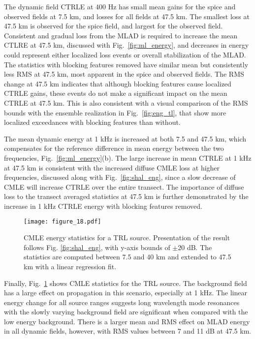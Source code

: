\documentclass[preprint,NumberedRefs]{JASA}
\begin{document}
The dynamic field CTRLE at 400 Hz has small mean gains for the spice and observed fields at 7.5 km, and losses for all fields at 47.5 km. The smallest loss at 47.5 km is observed for the spice field, and largest for the observed field. Consistent and gradual loss from the MLAD is required to increase the mean CTLRE at 47.5 km, discussed with Fig.~\ref{fig:ml_energy}, and decreases in energy could represent either localized loss events or overall stabilization of the MLAD. The statistics with blocking features removed have similar mean but consistently less RMS at 47.5 km, most apparent in the spice and observed fields. The RMS change at 47.5 km indicates that although blocking features cause localized CTRLE gains, these events do not make a significant impact on the mean CTRLE at 47.5 km. This is also consistent with a visual comparison of the RMS bounds with the ensemble realization in Fig.~\ref{fig:eng_tl}, that show more localized exceedances with blocking features than without.

The mean dynamic energy at 1 kHz is increased at both 7.5 and 47.5 km, which compensates for the reference difference in mean energy between the two frequencies, Fig.~\ref{fig:ml_energy}(b). The large increase in mean CTRLE at 1 kHz at 47.5 km is consistent with the increased diffuse CMLE loss at higher frequencies, discussed along with Fig.~\ref{fig:shal_eng}, since a slow decrease of CMLE will increase CTRLE over the entire transect. The importance of diffuse loss to the transect averaged statistics at 47.5 km is further demonstrated by the increase in 1 kHz CTRLE energy with blocking features removed.

\begin{figure}
\texttt{[image: figure\_18.pdf]}
    \caption{CMLE energy statistics for a TRL source. Presentation of the result follows Fig. \ref{fig:shal_eng}, with y-axis bounds of $\pm$20 dB. The statistics are computed between 7.5 and 40 km and extended to 47.5 km with a linear regression fit.}
    \label{fig:deep_eng}
\end{figure}
Finally, Fig.~\ref{fig:deep_eng} shows CMLE statistics for the TRL source. The background field has a large effect on propagation in this scenario, especially at 1 kHz. The linear energy change for all source ranges suggests long wavelength mode resonances with the slowly varying background field\cite{colosi21} are significant when compared with the low energy background. There is a larger mean and RMS effect on MLAD energy in all dynamic fields, however, with RMS values between 7 and 11 dB at 47.5 km.
\end{document}
